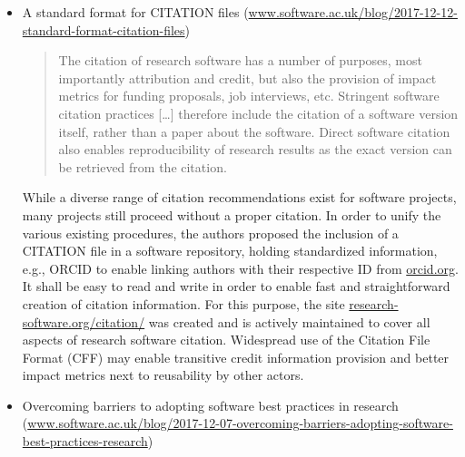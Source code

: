 \documentclass[11pt,letterpaper]{article}
\begin{document}
\begin{itemize}
\item A standard format for CITATION files (\href{https://www.software.ac.uk/blog/2017-12-12-standard-format-citation-files}{www.software.ac.uk/blog/2017-12-12-standard-format-citation-files})
\begin{quote}
The citation of research software has a number of purposes, most importantly attribution and credit, but also the provision of impact metrics for funding proposals, job interviews, etc. Stringent software citation practices [\ldots] therefore include the citation of a software version itself, rather than a paper about the software. Direct software citation also enables reproducibility of research results as the exact version can be retrieved from the citation. 
\end{quote}
While a diverse range of citation recommendations exist for software projects, many projects still proceed without a proper citation. In order to unify the various existing  procedures, the authors proposed the inclusion of a CITATION file in a software repository, holding standardized information, e.g., ORCID to enable linking authors with their respective ID from \href{https://orcid.org}{orcid.org}. It shall be easy to read and write in order to enable fast and straightforward creation of citation information. For this purpose, the site \href{https://research-software.org/citation/}{research-software.org/citation/} was created and is actively maintained to cover all aspects of research software citation. Widespread use of the Citation File Format (CFF) may enable transitive credit information provision and better impact metrics next to reusability by other actors.


\item Overcoming barriers to adopting software best practices in research (\href{https://www.software.ac.uk/blog/2017-12-07-overcoming-barriers-adopting-software-best-practices-research}{www.software.ac.uk/blog/2017-12-07-overcoming-barriers-adopting-software-best-practices-research})


\end{itemize}
\end{document}
